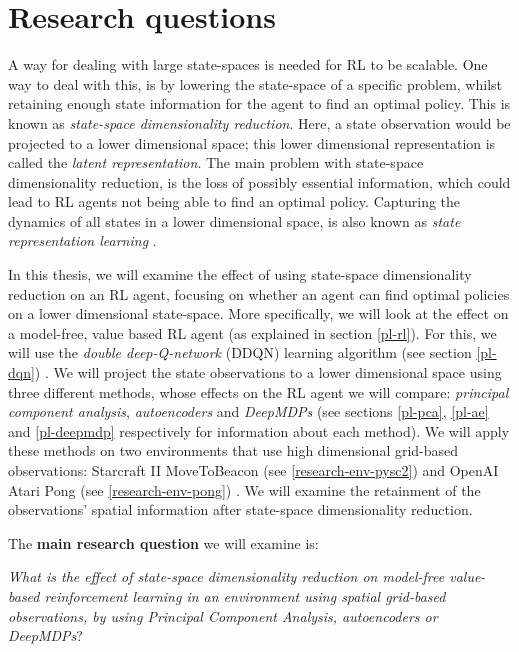 \section{Research questions}
A way for dealing with large state-spaces is needed for RL to be scalable. One way to deal with this, is by lowering the state-space of a specific problem, whilst retaining enough state information for the agent to find an optimal policy. This is known as \emph{state-space dimensionality reduction}. Here, a state observation would be projected to a lower dimensional space; this lower dimensional representation is called the \emph{latent representation}. The main problem with state-space dimensionality reduction, is the loss of possibly essential information, which could lead to RL agents not being able to find an optimal policy. Capturing the dynamics of all states in a lower dimensional space, is also known as \emph{state representation learning} \cite{representation_overview}.

In this thesis, we will examine the effect of using state-space dimensionality reduction on an RL agent, focusing on whether an agent can find optimal policies on a lower dimensional state-space. More specifically, we will look at the effect on a model-free, value based RL agent (as explained in section \ref{pl-rl}). For this, we will use the \emph{double deep-Q-network} (DDQN) learning algorithm (see section \ref{pl-dqn}) \cite{ddqn}. We will project the state observations to a lower dimensional space using three different methods, whose effects on the RL agent we will compare: \emph{principal component analysis}, \emph{autoencoders} and \emph{DeepMDPs} (see sections \ref{pl-pca}, \ref{pl-ae} and \ref{pl-deepmdp} respectively for information about each method). We will apply these methods on two environments that use high dimensional grid-based observations: Starcraft II MoveToBeacon (see \ref{research-env-pysc2}) and OpenAI Atari Pong (see \ref{research-env-pong}) \cite{pysc2}\cite{pong}. We will examine the retainment of the observations' spatial information after state-space dimensionality reduction.

The \textbf{main research question} we will examine is:\newline

\noindent \textit{What is the effect of state-space dimensionality reduction on model-free value-based reinforcement learning in an environment using spatial grid-based observations, by using Principal Component Analysis, autoencoders or DeepMDPs}? \newline

